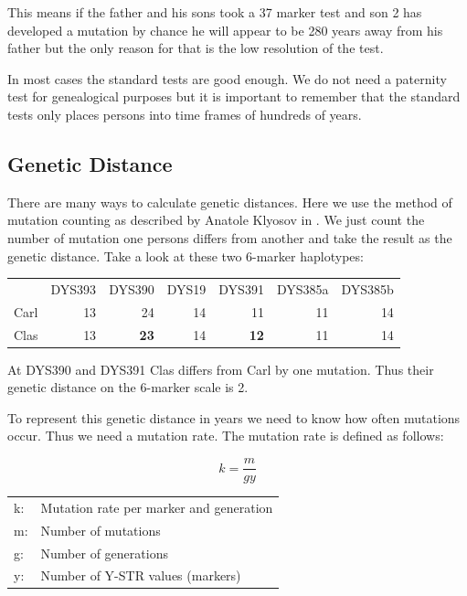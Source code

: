 This means if the father and his sons took a 37 marker test
and son 2 has developed a mutation by chance he will appear
to be 280 years away from his father but the only reason for
that is the low resolution of the test.

In most cases the standard tests are good enough. We do not
need a paternity test for genealogical purposes but it is
important to remember that the standard tests only places
persons into time frames of hundreds of years.


\subsection{Genetic Distance}

There are many ways to calculate genetic distances. Here we
use the method of mutation counting as described by Anatole
Klyosov in \cite{Kly09}.
We just count the number of mutation one persons differs from
another and take the result as the genetic distance.
Take a look at these two 6-marker haplotypes:

\vspace{1em}
\begin{tabular}{lrrrrrr}
       & DYS393 & DYS390      & DYS19 & DYS391      & DYS385a & DYS385b \\
Carl   &     13 & 24          & 14    & 11          & 11      & 14 \\
Clas   &     13 & \textbf{23} & 14    & \textbf{12} & 11      & 14
\end{tabular}
\vspace{1em}

At DYS390 and DYS391 Clas differs from Carl by one mutation.
Thus their genetic distance on the 6-marker scale is 2.

To represent this genetic distance in years we need to know
how often mutations occur. Thus we need a mutation rate.
The mutation rate is defined as follows:

\begin{equation}
k = \frac{m}{g y} \label{mutationrate}
\end{equation}

\begin{tabular}{ll}
k: &  Mutation rate per marker and generation\\
m: &  Number of mutations \\
g: &  Number of generations \\
y: &  Number of Y-STR values (markers)
\end{tabular}
\vspace{1em}

